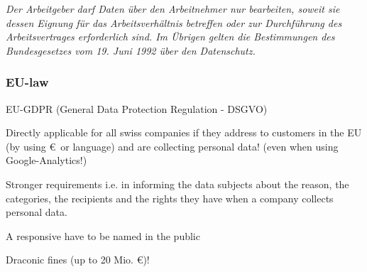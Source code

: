 \textit{Der Arbeitgeber darf Daten über den Arbeitnehmer nur bearbeiten, soweit sie dessen Eignung für das Arbeitsverhältnis betreffen oder zur Durchführung des Arbeitsvertrages erforderlich sind. Im Übrigen gelten die Bestimmungen des Bundesgesetzes vom 19. Juni 1992 über den Datenschutz.}

\subsubsection{EU-law}
\begin{compactitem}	
	\item EU-GDPR (General Data Protection Regulation - DSGVO)
	\item Directly applicable for all swiss companies if they address to customers in the EU (by using \euro\ or language) and are collecting personal data! (even when using Google-Analytics!)
	\item Stronger requirements i.e. in informing the data subjects about the reason, the categories, the recipients and the rights they have when a company collects personal data.
	\item A responsive have to be named in the public
	\item Draconic fines (up to 20 Mio. \euro)!
\end{compactitem}